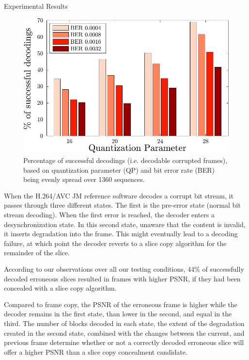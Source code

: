 \documentclass{article}
\newcommand{\ltCodec}{H.264/AVC JM reference software}
\begin{document}
\begin{section}{Experimental Results}
\begin{figure}%
\centering
\includegraphics[width=1\linewidth]{graphics/Decodings.pdf}\vspace{-1em}
\caption{\small{}Percentage of successful decodings (i.e. decodable corrupted 
frames), based on quantization 
parameter
(QP) and bit error rate (BER) being evenly spread over 1360 sequences.}
\label{fig-Decodings}
\end{figure}

When the \ltCodec{} decodes a corrupt bit stream, it passes through 
three different states. The first is the pre-error state (normal bit stream 
decoding).
When the first error is reached, the decoder enters a desynchronization state. 
In this second state, unaware that the content is invalid, it inserts 
degradation into 
the frame. This might eventually lead to a decoding failure, at which point the 
decoder reverts to a slice copy algorithm for the remainder of the slice.

According to our observations over all our testing conditions, 44\% of
successfully decoded erroneous slices resulted in frames with higher PSNR, if
they had been concealed with a slice copy algorithm.

Compared to frame copy, the
PSNR of the erroneous frame is higher while the decoder remains in the first 
state,
than lower in the second, and equal in the third. The number of blocks decoded
in each state, the extent of the degradation created in the second state, 
combined with the
changes between the current, and previous frame determine whether or not 
a correctly decoded erroneous slice will offer a higher PSNR than a slice copy 
concealment candidate.


\end{section}
\end{document}
